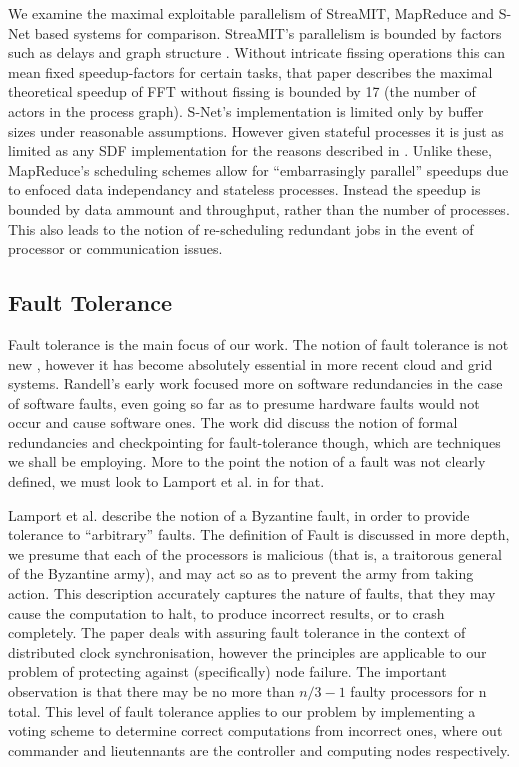 We examine the maximal exploitable parallelism of StreaMIT, MapReduce and S-Net based systems for comparison.
StreaMIT's parallelism is bounded by factors such as delays and graph structure \cite{thies02}.
Without intricate fissing operations \cite{mal08} this can mean fixed speedup-factors for certain tasks, that paper describes the maximal theoretical speedup of FFT without fissing is bounded by 17 (the number of actors in the process graph).
S-Net's implementation is limited only by buffer sizes \cite{pen09} under reasonable assumptions.  However given stateful processes it is just as limited as any SDF implementation for the reasons described in \cite{mal08}.
Unlike these, MapReduce's scheduling schemes allow for ``embarrasingly parallel'' speedups \cite{dea08} due to enfoced data independancy and stateless processes.
Instead the speedup is bounded by data ammount and throughput, rather than the number of processes.
This also leads to the notion of re-scheduling redundant \cite{ran07} jobs in the event of processor or communication issues.

\subsection*{Fault Tolerance}

Fault tolerance is the main focus of our work.
The notion of fault tolerance is not new \cite{ran75}, however it has become absolutely essential in more recent cloud and grid systems.
Randell's early work focused more on software redundancies in the case of software faults, even going so far as to presume hardware faults would not occur and cause software ones.
The work did discuss the notion of formal redundancies and checkpointing for fault-tolerance though, which are techniques we shall be employing.
More to the point the notion of a fault was not clearly defined, we must look to Lamport et al. in \cite{lam86} for that.

Lamport et al. describe the notion of a Byzantine fault, in order to provide tolerance to ``arbitrary'' faults.
The definition of Fault is discussed in more depth, we presume that each of the processors is malicious (that is, a traitorous general of the Byzantine army), and may act so as to prevent the army from taking action.
This description accurately captures the nature of faults, that they may cause the computation to halt, to produce incorrect results, or to crash completely.
The paper deals with assuring fault tolerance in the context of distributed clock synchronisation, however the principles are applicable to our problem of protecting against (specifically) node failure.
The important observation is that there may be no more than $n/3 - 1$ faulty processors for n total.
This level of fault tolerance applies to our problem by implementing a voting scheme \cite{lam86} to determine correct computations from incorrect ones, where out commander and lieutennants are the controller and computing nodes respectively.

